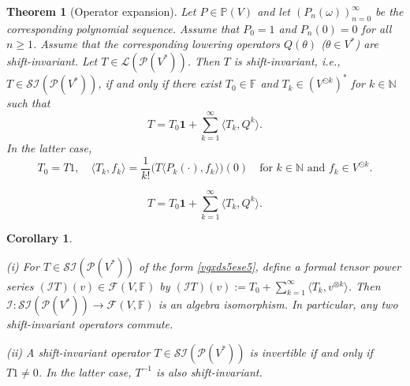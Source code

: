 \documentclass[10pt,a4paper]{amsart}
\newtheorem{theorem}{Theorem}
\newtheorem{corollary}{Corollary}
\begin{document}
\begin{theorem}[Operator expansion]\label{bgnfm758} Let $P\in\mathbb P(V)$ and let $(P_n(\omega))_{n=0}^\infty$ be the corresponding polynomial sequence. Assume that 
  $P_0=1$ and $P_n (0)=0$ for all $n\geq 1$.    Assume that the corresponding lowering operators $Q(\theta)$  ($\theta\in V^*$) are shift-invariant. Let $T \in \mathcal L(\mathcal P  (V^*))$. Then $T$ is shift-invariant, i.e., $T\in\mathcal{SI}(\mathcal P  (V^*))$, if and only if there exist $T_0\in \mathbb F$ and $T_k\in (V^{\odot  k})^*$ for $k\in \mathbb N$ such that
\begin{equation}\label{vgxds5ese5}T=T_0\mathbf 1+\sum_{k=1}^\infty \langle T_k,
Q^{k}\rangle .\end{equation}
In the latter case,  
\begin{equation}\label{gxes5seasew}T_0=T 1,\quad \langle 
T_k, f_k \rangle =\frac1{k!}\big(T\langle P_k(\cdot),f_k\rangle\big)(0)\quad\text{for $k\in\mathbb N$ and $f_k\in V^{\odot   k}$}.
\end{equation} 
\end{theorem}

\begin{equation}T=T_0\mathbf 1+\sum_{k=1}^\infty \langle T_k,
Q^{k}\rangle .\end{equation}

\begin{corollary}\label{567ty7} 
  

{\rm (i)\/} For  $T \in \mathcal {SI}(\mathcal P  (V^*))$ of the form \eqref{vgxds5ese5}, define a formal tensor power series $(\mathcal IT)(v)\in \mathcal F(V,\mathbb F)$ by
$(\mathcal IT)(v):=T_0+\sum_{k=1}^\infty \langle T_k,v^{\otimes k}\rangle$.
Then $\mathcal I:\mathcal{SI}(\mathcal P  (V^*))\to \mathcal F(V,\mathbb F)$
 is an algebra isomorphism. In particular, any two shift-invariant operators commute. 

{\rm (ii)\/} A shift-invariant operator $T\in \mathcal{SI}(\mathcal P    (V^*))$  is invertible if and only if $T1\ne0$. In the latter case, $T^{-1}$ is also shift-invariant. 
\end{corollary}
\end{document}
